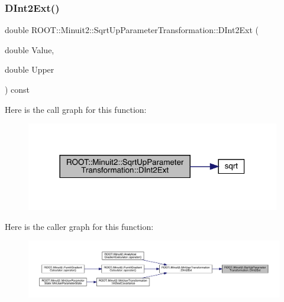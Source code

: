 \subsubsection{\texorpdfstring{DInt2Ext()}{DInt2Ext()}\hspace{0.1cm}{\footnotesize\ttfamily [1/2]}}
{\footnotesize\ttfamily double R\+O\+O\+T\+::\+Minuit2\+::\+Sqrt\+Up\+Parameter\+Transformation\+::\+D\+Int2\+Ext (\begin{DoxyParamCaption}\item[{double}]{Value,  }\item[{double}]{Upper }\end{DoxyParamCaption}) const}

Here is the call graph for this function\+:\nopagebreak
\begin{figure}[H]
\begin{center}
\leavevmode
\includegraphics[width=314pt]{d4/d77/classROOT_1_1Minuit2_1_1SqrtUpParameterTransformation_a82e3860242c4f0d7a81dabef95803bd1_cgraph}
\end{center}
\end{figure}
Here is the caller graph for this function\+:\nopagebreak
\begin{figure}[H]
\begin{center}
\leavevmode
\includegraphics[width=350pt]{d4/d77/classROOT_1_1Minuit2_1_1SqrtUpParameterTransformation_a82e3860242c4f0d7a81dabef95803bd1_icgraph}
\end{center}
\end{figure}
\mbox{\label{classROOT_1_1Minuit2_1_1SqrtUpParameterTransformation_a82e3860242c4f0d7a81dabef95803bd1}} 

